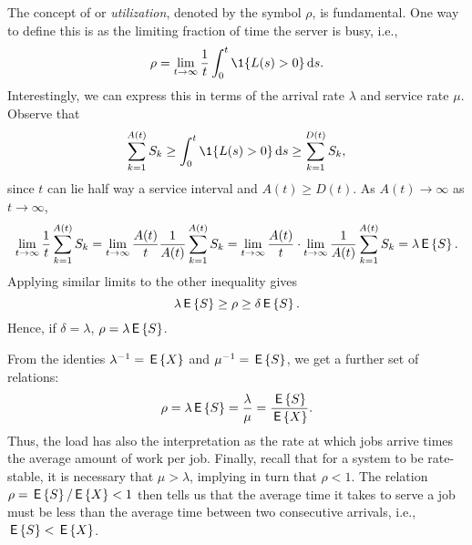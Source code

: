 The concept of  or \emph{utilization}, denoted by the
symbol $\rho$, is fundamental. One way to define this is  as the limiting
fraction of time the server is busy, i.e.,
\begin{equation*}
  \rho = \lim_{t\to\infty} \frac 1 t \int_0^t \1{L(s)>0} \d s.
\end{equation*}
Interestingly, we can express this in terms of the arrival rate
$\lambda$ and service rate $\mu$. Observe that
\begin{equation*}
  \sum_{k=1}^{A(t)} S_k \geq \int_0^t \1{L(s)>0} \d s \geq   \sum_{k=1}^{D(t)} S_k,
\end{equation*}
since $t$ can lie half way a service interval and $A(t) \geq D(t)$. As
$A(t)\to \infty$ as $t\to\infty$,
\begin{equation*}
  \lim_{t\to\infty} \frac 1 t\sum_{k=1}^{A(t)} S_k = 
  \lim_{t\to\infty} \frac{A(t)}t \frac{1}{A(t)} \sum_{k=1}^{A(t)} S_k = 
  \lim_{t\to\infty} \frac{A(t)}t \cdot \lim_{t\to\infty}\frac{1}{A(t)} \sum_{k=1}^{A(t)} S_k = \lambda \,\mathsf{E}\left\{S\right\}.
\end{equation*}
Applying similar limits to the other inequality gives
\begin{equation*}
\lambda \,\mathsf{E}\left\{S\right\} \geq \rho \geq \delta \,\mathsf{E}\left\{S\right\}.
\end{equation*}
Hence, if $\delta=\lambda$, $\rho = \lambda \,\mathsf{E}\left\{S\right\}$.  

From the identies $\lambda^{-1} = \,\mathsf{E}\left\{X\right\}$ and $\mu^{-1} = \,\mathsf{E}\left\{S\right\}$, we get
a further set of relations:
\begin{equation*}
  \rho = \lambda \,\mathsf{E}\left\{S\right\} = \frac{\lambda}{\mu} = \frac{\,\mathsf{E}\left\{S\right\}}{\,\mathsf{E}\left\{X\right\}}.
\end{equation*}
Thus, the load has also the interpretation as the rate at which jobs
arrive times the average amount of work per job.  Finally,
recall that for a system to be rate-stable, it is necessary that
$\mu> \lambda$, implying in turn that $\rho < 1$. The relation
$\rho=\,\mathsf{E}\left\{S\right\}/ \,\mathsf{E}\left\{X\right\} < 1$ then tells us that the average time it takes to
serve a job must be less than the average time between two consecutive
arrivals, i.e., $\,\mathsf{E}\left\{S\right\} < \,\mathsf{E}\left\{X\right\}$.


